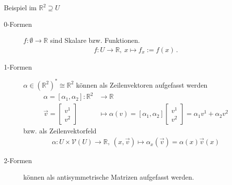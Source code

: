 \documentclass[handout]{beamer}
\newcommand{\R}{\mathds{R}}
\newcommand{\formpunkt}{\,\text{.}}
\begin{document}
  \begin{frame}
    \begin{block}{Beispiel im \( \R^{2} \supseteq U\)}
      \begin{description}
        \item[0-Formen] \( f:\emptyset\rightarrow\R \) sind Skalare 
          bzw. Funktionen.
          \begin{align*}
            f:U\rightarrow\R,\ x\mapsto f_{x}:=f(x) \formpunkt
          \end{align*}
        \item[1-Formen] \( \alpha\in\left( \R^{2} \right)^{*}\cong\R^{2}  \) können als Zeilenvektoren
          aufgefasst werden
          \begin{align*}
            \alpha = \left[ \alpha_{1},\alpha_{2} \right]:\R^{2}&\rightarrow\R \\ 
                   \vec{v} = \begin{bmatrix}
                    v^{1} \\ v^{2}
                   \end{bmatrix}
                   &\mapsto \alpha(v) = \left[ \alpha_{1},\alpha_{2} \right] \begin{bmatrix}
                          v^{1} \\ v^{2}
                          \end{bmatrix}
                   = \alpha_{1}v^{1} + \alpha_{2}v^{2}
          \end{align*}
          bzw. als Zeilenvektorfeld
          \begin{align*}
            \alpha: U\times\mathcal{V}(U)\rightarrow\R,\ 
                  \left( x,\vec{v} \right)\mapsto\alpha_{x}(\vec{v})=\alpha(x)\vec{v}(x)
          \end{align*}
        \item[2-Formen] können als antisymmetrische Matrizen aufgefasst werden.
      \end{description}
    \end{block}
  \end{frame}
\end{document}
